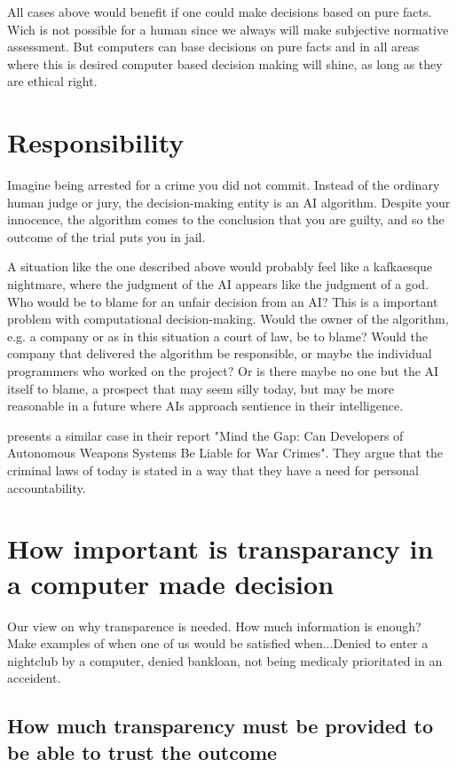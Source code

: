\documentclass[11pt]{article}
\begin{document}
All cases above would benefit if one could make decisions based on pure facts. Wich is not possible for a human
since we always will make subjective normative assessment. But computers can base decisions on pure facts and in all areas where this is desired computer based decision making will shine, as long as they are ethical right.

\section{Responsibility}
Imagine being arrested for a crime you did not commit.
Instead of the ordinary human judge or jury, the decision-making entity is an AI
algorithm. Despite your innocence, the algorithm comes to the conclusion that
you are guilty, and so the outcome of the trial puts you in jail.

A situation like the one described above would probably feel like a kafkaesque nightmare,
where the judgment of the AI appears like the judgment of a god. Who would be to
blame for an unfair decision from an AI? This is a important problem with
computational decision-making. Would the owner of the algorithm, e.g. a company
or as in this situation a court of law, be to blame? Would the company that
delivered the algorithm be responsible, or maybe the individual programmers who
worked on the project? Or is there maybe no one but the AI itself to blame, a
prospect that may seem silly today, but may be more reasonable in a future where
AIs approach sentience in their intelligence.

\citeauthor{mcfarland2014mind} presents a similar case in their report "Mind the Gap: Can Developers of Autonomous Weapons Systems Be Liable for War Crimes". They argue that the criminal laws of today is stated in a way that they have a need for personal accountability. 


\section{How important is transparancy in a computer made decision}
Our view on why transparence is needed. How much information is enough?
Make examples of when one of us would be satisfied when...Denied to enter a nightclub by a computer, denied bankloan, not being medicaly prioritated in an acceident. 
\subsection{How much transparency must be provided to be able to trust the outcome}
\end{document}
